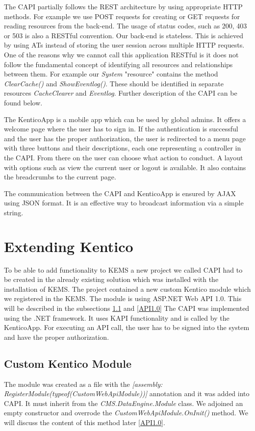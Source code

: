 The CAPI partially follows the REST architecture by using appropriate HTTP methods. For example we use POST requests for creating or GET requests for reading resources from the back-end. The usage of status codes, such as 200, 403 or 503 is also a RESTful convention. Our back-end is stateless. This is achieved by using ATs instead of storing the user session across multiple HTTP requests. One of the reasons why we cannot call this application RESTful is it does not follow the fundamental concept of identifying all resources and relationships between them. For example our \textit{System} "resource" contains the method \textit{ClearCache()} and \textit{ShowEventlog()}. These should be identified in separate resources \textit{CacheClearer} and \textit{Eventlog}. Further description of the CAPI can be found below.

The KenticoApp is a mobile app which can be used by global admins. It offers a welcome page where the user has to sign in. If the authentication is successful and the user has the proper authorization, the user is redirected to a menu page with three buttons and their descriptions, each one representing a controller in the CAPI. From there on the user can choose what action to conduct. A layout with options such as view the current user or logout is available. It also contains the breadcrumbs to the current page. 

The communication between the CAPI and KenticoApp is ensured by AJAX using JSON format. It is an effective way to broadcast information via a simple string.

\section{Extending Kentico} \label{implExtendingKentico}
To be able to add functionality to KEMS a new project we called CAPI had to be created in the already existing solution which was installed with the installation of KEMS. The project contained a new  custom Kentico module which we registered in the KEMS. The module is using ASP.NET Web API 1.0. This will be described in the subsections \ref{cutomModule} and \ref{API1.0}
The CAPI was implemented using the .NET framework. It uses KAPI functionality and is called by the KenticoApp. For executing an API call, the user has to be signed into the system and have the proper authorization. 
\subsection{Custom Kentico Module} \label{cutomModule}
The module was created as a file with the \textit{[assembly: RegisterModule(typeof(CustomWebApiModule))]} annotation and it was added into CAPI. It must inherit from the \textit{CMS.DataEngine.Module} class. We adjoined an empty constructor and overrode the \textit{CustomWebApiModule.OnInit()} method. We will discuss the content of this method later \ref{API1.0}. 
